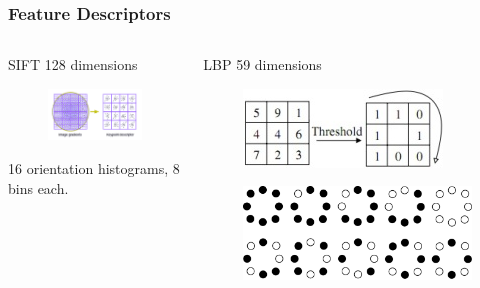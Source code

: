 \documentclass{beamer}
\begin{document}
\begin{frame}
\frametitle{Feature Descriptors}
\begin{columns}
\begin{column}{.3\textwidth}
\begin{block}{SIFT}
128 dimensions
\begin{figure}
\includegraphics[width=\textwidth]{SIFT}
\end{figure}
16 orientation histograms, 8 bins each.
\end{block}
\end{column}
\pause
\begin{column}{.3\textwidth}
\begin{block}{LBP}
59 dimensions
\begin{figure}
\includegraphics[width=\textwidth]{LBPSimple}
\end{figure}
\begin{figure}
\includegraphics[width=\textwidth]{LBPU2}

\end{figure}
\end{block}
\end{column}
\end{columns}
\end{frame}
\end{document}

